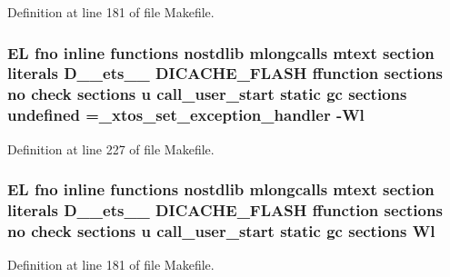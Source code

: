 Definition at line 181 of file Makefile.

\hypertarget{Makefile_a9324bb2c20136255586f3b51593c4291}{
\subsubsection[{undefined}]{\setlength{\rightskip}{0pt plus 5cm}E\-L fno inline functions nostdlib mlongcalls mtext section literals D\-\_\-\-\_\-ets\-\_\-\-\_\- D\-I\-C\-A\-C\-H\-E\-\_\-\-F\-L\-A\-S\-H ffunction sections no check sections u call\-\_\-user\-\_\-start static gc sections undefined =\-\_\-xtos\-\_\-set\-\_\-exception\-\_\-handler -\/{\bf Wl}\hspace{0.3cm}{\ttfamily [static]}}}\label{Makefile_a9324bb2c20136255586f3b51593c4291}


Definition at line 227 of file Makefile.

\hypertarget{Makefile_afb1782b240d70229ae5bc6b111f9794a}{
\subsubsection[{Wl}]{\setlength{\rightskip}{0pt plus 5cm}E\-L fno inline functions nostdlib mlongcalls mtext section literals D\-\_\-\-\_\-ets\-\_\-\-\_\- D\-I\-C\-A\-C\-H\-E\-\_\-\-F\-L\-A\-S\-H ffunction sections no check sections u call\-\_\-user\-\_\-start static gc sections Wl}}\label{Makefile_afb1782b240d70229ae5bc6b111f9794a}


Definition at line 181 of file Makefile.


